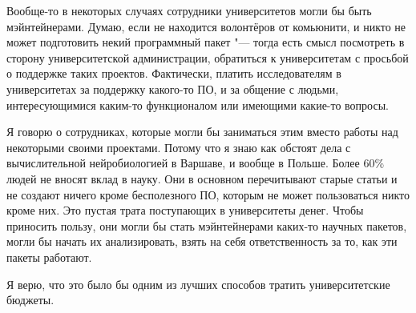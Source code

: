\documentclass[10pt, a5paper]{article}
\begin{document}
\begin{Parallel}[p]{}{}
{Вообще-то в некоторых случаях сотрудники университетов могли бы быть мэйнтейнерами. Думаю, если не находится волонтёров от комьюнити, и никто не может подготовить некий программный пакет "--- тогда есть смысл посмотреть в сторону университетской администрации, обратиться к университетам с просьбой о поддержке таких проектов. Фактически, платить исследователям в университетах за поддержку какого-то ПО, и за общение с людьми, интересующимися каким-то функционалом или имеющими какие-то вопросы. 

Я говорю о сотрудниках, которые могли бы заниматься этим вместо работы над некоторыми своими проектами. Потому что я знаю как обстоят дела с вычислительной нейробиологией в Варшаве, и вообще в Польше. Более 60\% людей не вносят вклад в науку. Они в основном перечитывают старые статьи и не создают ничего кроме бесполезного ПО, которым не может пользоваться никто кроме них. Это пустая трата поступающих в университеты денег. Чтобы приносить пользу, они могли бы стать мэйнтейнерами каких-то научных пакетов, могли бы начать их анализировать, взять на себя ответственность за то, как эти пакеты работают.

Я верю, что это было бы одним из лучших способов тратить университетские бюджеты. 
\vfill

     }
   \end{Parallel}









 
\end{document}

